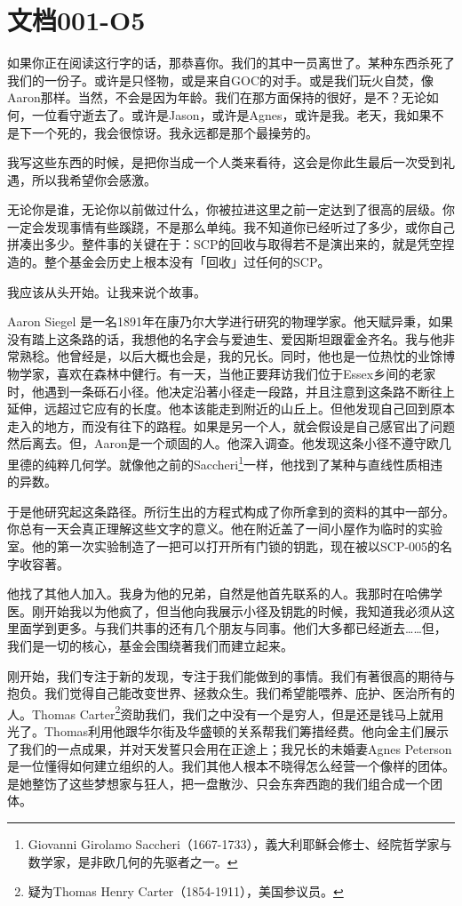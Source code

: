 \chapter{文档001-O5}

\label{chap:doc.001-05}

如果你正在阅读这行字的话，那恭喜你。我们的其中一员离世了。某种东西杀死了我们的一份子。或许是只怪物，或是来自GOC的对手。或是我们玩火自焚，像Aaron那样。当然，不会是因为年龄。我们在那方面保持的很好，是不？无论如何，一位看守逝去了。或许是Jason，或许是Agnes，或许是我。老天，我如果不是下一个死的，我会很惊讶。我永远都是那个最操劳的。

我写这些东西的时候，是把你当成一个人类来看待，这会是你此生最后一次受到礼遇，所以我希望你会感激。

无论你是谁，无论你以前做过什么，你被拉进这里之前一定达到了很高的层级。你一定会发现事情有些蹊跷，不是那么单纯。我不知道你已经听过了多少，或你自己拼凑出多少。整件事的关键在于：SCP的回收与取得若不是演出来的，就是凭空捏造的。整个基金会历史上根本没有「回收」过任何的SCP。

我应该从头开始。让我来说个故事。

Aaron Siegel 是一名1891年在康乃尔大学进行研究的物理学家。他天赋异秉，如果没有踏上这条路的话，我想他的名字会与爱迪生、爱因斯坦跟霍金齐名。我与他非常熟稔。他曾经是，以后大概也会是，我的兄长。同时，他也是一位热忱的业馀博物学家，喜欢在森林中健行。有一天，当他正要拜访我们位于Essex乡间的老家时，他遇到一条砾石小径。他决定沿著小径走一段路，并且注意到这条路不断往上延伸，远超过它应有的长度。他本该能走到附近的山丘上。但他发现自己回到原本走入的地方，而没有往下的路程。如果是另一个人，就会假设是自己感官出了问题然后离去。但，Aaron是一个顽固的人。他深入调查。他发现这条小径不遵守欧几里德的纯粹几何学。就像他之前的Saccheri\footnote{Giovanni Girolamo Saccheri（1667-1733），義大利耶稣会修士、经院哲学家与数学家，是非欧几何的先驱者之一。}一样，他找到了某种与直线性质相违的异数。

于是他研究起这条路径。所衍生出的方程式构成了你所拿到的资料的其中一部分。你总有一天会真正理解这些文字的意义。他在附近盖了一间小屋作为临时的实验室。他的第一次实验制造了一把可以打开所有门锁的钥匙，现在被以SCP-005的名字收容著。

他找了其他人加入。我身为他的兄弟，自然是他首先联系的人。我那时在哈佛学医。刚开始我以为他疯了，但当他向我展示小径及钥匙的时候，我知道我必须从这里面学到更多。与我们共事的还有几个朋友与同事。他们大多都已经逝去……但，我们是一切的核心，基金会围绕著我们而建立起来。

刚开始，我们专注于新的发现，专注于我们能做到的事情。我们有著很高的期待与抱负。我们觉得自己能改变世界、拯救众生。我们希望能喂养、庇护、医治所有的人。Thomas Carter\footnote{疑为Thomas Henry Carter（1854-1911），美国参议员。}资助我们，我们之中没有一个是穷人，但是还是钱马上就用光了。Thomas利用他跟华尔街及华盛顿的关系帮我们筹措经费。他向金主们展示了我们的一点成果，并对天发誓只会用在正途上；我兄长的未婚妻Agnes Peterson是一位懂得如何建立组织的人。我们其他人根本不晓得怎么经营一个像样的团体。是她整饬了这些梦想家与狂人，把一盘散沙、只会东奔西跑的我们组合成一个团体。

